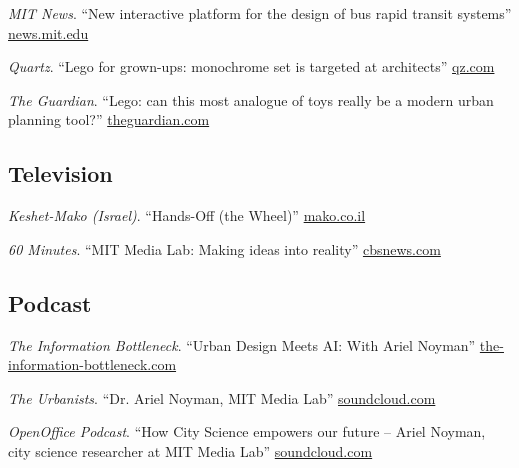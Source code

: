 \begin{tablist}
    \item[2015] \tab \textit{MIT News}. \enquote{New interactive platform for the design of bus rapid transit systems}
    \href{http://news.mit.edu/2015/interactive-platform-design-bus-rapid-transit-brt-systems-1007}{news.mit.edu}

    \item[2015] \tab \textit{Quartz}. \enquote{Lego for grown-ups: monochrome set is targeted at architects}
    \href{https://qz.com/315776/lego-for-grown-ups-the-toy-maker-is-targeting-architects-and-urban-planners/}{qz.com}

    \item[2014] \tab \textit{The Guardian}. \enquote{Lego: can this most analogue of toys really be a modern urban planning tool?}
    \href{https://www.theguardian.com/cities/2014/dec/18/lego-toys-urban-planning-tool-architects-mit}{theguardian.com}

    \subsection*{Television}
    \item[2019] \tab \textit{Keshet-Mako (Israel)}. \enquote{Hands-Off (the Wheel)}
    \href{https://www.mako.co.il/nexter-weekend/Article-29c0ce116238d51006.htm}{mako.co.il}

    \item[2019] \tab \textit{60 Minutes}. \enquote{MIT Media Lab: Making ideas into reality}
    \href{https://www.cbsnews.com/news/60-minutes-mit-media-lab-making-ideas-into-reality-future-factory-2019-08-04/}{cbsnews.com}

    \subsection*{Podcast}
    \item[2025] \tab \textit{The Information Bottleneck}. \enquote{Urban Design Meets AI: With Ariel Noyman}
    \href{https://www.the-information-bottleneck.com/ep6-urban-design-meets-ai-with-ariel-noyman/}{the-information-bottleneck.com}

    \item[2022] \tab \textit{The Urbanists}. \enquote{Dr. Ariel Noyman, MIT Media Lab}
    \href{https://soundcloud.com/omer-raz/40a}{soundcloud.com}

    \item[2019] \tab \textit{OpenOffice Podcast}. \enquote{How City Science empowers our future -- Ariel Noyman, city science researcher at MIT Media Lab}
    \href{https://soundcloud.com/openofficepodcast/5-how-city-science-empowers-our-future-ariel-noyman-city-science-researcher-at-mit-media-lab}{soundcloud.com}


\end{tablist}
